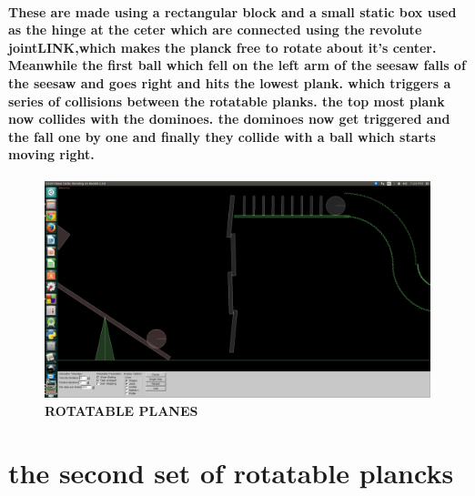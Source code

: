 \paragraph{
These are made using a rectangular block and a small static box used as the hinge at the ceter which are connected using the revolute joint\textbf{LINK},which makes the planck free to rotate about it's center.
Meanwhile the first ball which fell on the left arm of the seesaw falls of the seesaw and goes right and hits the lowest plank.
which triggers a series of collisions between the rotatable planks.
the top most plank now collides with the dominoes.
the dominoes now get triggered and the fall one by one and finally they collide with a ball which starts moving right.
}
\begin{figure}[H]
  \centering
    \includegraphics[scale=0.2]{project/images/plating.png}
  \caption{\textbf{ROTATABLE PLANES}}
\end{figure}

\section{the second set of rotatable plancks}
